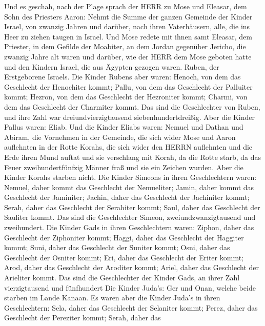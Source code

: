  Und es geschah, nach der Plage sprach der HERR zu Mose und
Eleasar, dem Sohn des Priesters Aaron:  Nehmt die Summe der
ganzen Gemeinde der Kinder Israel, von zwanzig Jahren und darüber, nach
ihren Vaterhäusern, alle, die ins Heer zu ziehen taugen in Israel.
 Und Mose redete mit ihnen samt Eleasar, dem Priester, in
dem Gefilde der Moabiter, an dem Jordan gegenüber Jericho, 
die zwanzig Jahre alt waren und darüber, wie der HERR dem Mose geboten
hatte und den Kindern Israel, die aus Ägypten gezogen waren.
 Ruben, der Erstgeborene Israels. Die Kinder Rubens aber
waren: Henoch, von dem das Geschlecht der Henochiter kommt; Pallu, von
dem das Geschlecht der Palluiter kommt;  Hezron, von dem das
Geschlecht der Hezroniter kommt; Charmi, von dem das Geschlecht der
Charmiter kommt.  Das sind die Geschlechter von Ruben, und
ihre Zahl war dreiundvierzigtausend siebenhundertdreißig. 
Aber die Kinder Pallus waren: Eliab.  Und die Kinder Eliabs
waren: Nemuel und Dathan und Abiram, die Vornehmen in der Gemeinde, die
sich wider Mose und Aaron auflehnten in der Rotte Korahs, die sich wider
den HERRN auflehnten  und die Erde ihren Mund auftat und
sie verschlang mit Korah, da die Rotte starb, da das Feuer
zweihundertfünfzig Männer fraß und sie ein Zeichen wurden. 
Aber die Kinder Korahs starben nicht.  Die Kinder Simeons
in ihren Geschlechtern waren: Nemuel, daher kommt das Geschlecht der
Nemueliter; Jamin, daher kommt das Geschlecht der Jaminiter; Jachin,
daher das Geschlecht der Jachiniter kommt;  Serah, daher
das Geschlecht der Serahiter kommt; Saul, daher das Geschlecht der
Sauliter kommt.  Das sind die Geschlechter Simeon,
zweiundzwanzigtausend und zweihundert.  Die Kinder Gads in
ihren Geschlechtern waren: Ziphon, daher das Geschlecht der Ziphoniter
kommt; Haggi, daher das Geschlecht der Haggiter kommt; Suni, daher das
Geschlecht der Suniter kommt;  Osni, daher das Geschlecht
der Osniter kommt; Eri, daher das Geschlecht der Eriter kommt;
 Arod, daher das Geschlecht der Aroditer kommt; Ariel,
daher das Geschlecht der Arieliter kommt.  Das sind die
Geschlechter der Kinder Gads, an ihrer Zahl vierzigtausend und
fünfhundert  Die Kinder Juda's: Ger und Onan, welche beide
starben im Lande Kanaan.  Es waren aber die Kinder Juda's
in ihren Geschlechtern: Sela, daher das Geschlecht der Selaniter kommt;
Perez, daher das Geschlecht der Pereziter kommt; Serah, daher das
